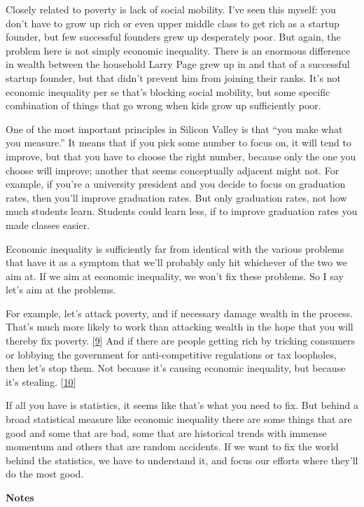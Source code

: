 Closely related to poverty is lack of social mobility. I've seen this
myself: you don't have to grow up rich or even upper middle class to get
rich as a startup founder, but few successful founders grew up
desperately poor. But again, the problem here is not simply economic
inequality. There is an enormous difference in wealth between the
household Larry Page grew up in and that of a successful startup
founder, but that didn't prevent him from joining their ranks. It's not
economic inequality per se that's blocking social mobility, but some
specific combination of things that go wrong when kids grow up
sufficiently poor.

One of the most important principles in Silicon Valley is that ``you
make what you measure.'' It means that if you pick some number to focus
on, it will tend to improve, but that you have to choose the right
number, because only the one you choose will improve; another that seems
conceptually adjacent might not. For example, if you're a university
president and you decide to focus on graduation rates, then you'll
improve graduation rates. But only graduation rates, not how much
students learn. Students could learn less, if to improve graduation
rates you made classes easier.

Economic inequality is sufficiently far from identical with the various
problems that have it as a symptom that we'll probably only hit
whichever of the two we aim at. If we aim at economic inequality, we
won't fix these problems. So I say let's aim at the problems.

For example, let's attack poverty, and if necessary damage wealth in the
process. That's much more likely to work than attacking wealth in the
hope that you will thereby fix poverty. {[}\hyperref[f9n]{9}{]} And if
there are people getting rich by tricking consumers or lobbying the
government for anti-competitive regulations or tax loopholes, then let's
stop them. Not because it's causing economic inequality, but because
it's stealing. {[}\hyperref[f10n]{10}{]}

If all you have is statistics, it seems like that's what you need to
fix. But behind a broad statistical measure like economic inequality
there are some things that are good and some that are bad, some that are
historical trends with immense momentum and others that are random
accidents. If we want to fix the world behind the statistics, we have to
understand it, and focus our efforts where they'll do the most good.

\textbf{Notes}

